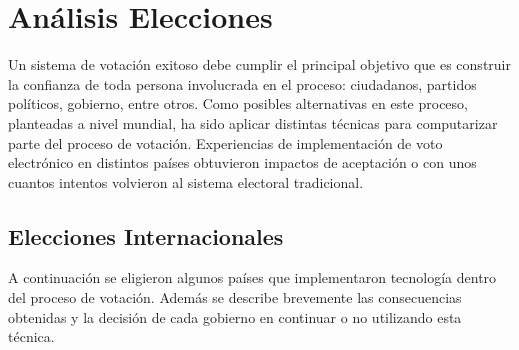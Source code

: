\label{Elecciones}
\chapter{Análisis Elecciones}

Un sistema de votación exitoso debe cumplir el principal objetivo que es construir la confianza de toda persona involucrada en el proceso: ciudadanos, partidos políticos, gobierno, entre otros. Como posibles alternativas en este proceso, planteadas a nivel mundial, ha sido aplicar distintas técnicas para computarizar parte del proceso de votación. 
Experiencias de implementación de voto electrónico en distintos países obtuvieron impactos de aceptación o con unos cuantos intentos volvieron al sistema electoral tradicional.

\section{Elecciones Internacionales}
A continuación se eligieron algunos países que implementaron tecnología dentro del proceso de votación. Además se describe brevemente las consecuencias obtenidas y la decisión de cada gobierno en continuar o no utilizando esta técnica.

